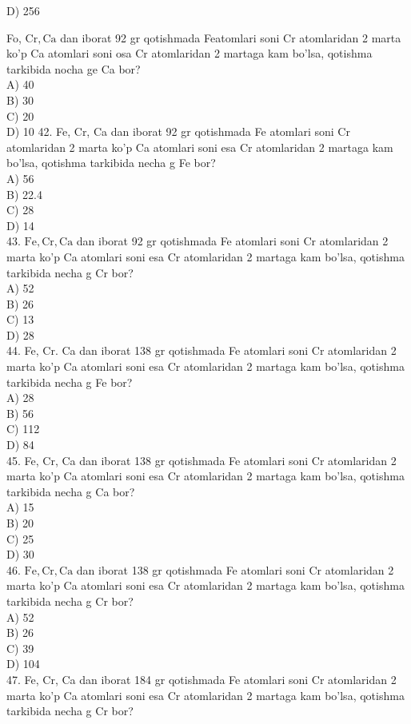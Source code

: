 D) 256
  \item Fo, $\mathrm{Cr}, \mathrm{Ca}$ dan iborat 92 gr qotishmada Featomlari soni Cr atomlaridan 2 marta ko'p Ca atomlari soni osa Cr atomlaridan 2 martaga kam bo'lsa, qotishma tarkibida nocha ge Ca bor?\\
A) 40\\
B) 30\\
C) 20\\
D) 10
42. Fe, Cr, Ca dan iborat 92 gr qotishmada Fe atomlari soni Cr atomlaridan 2 marta ko'p Ca atomlari soni esa Cr atomlaridan 2 martaga kam bo'lsa, qotishma tarkibida necha g Fe bor?\\
A) 56\\
B) 22.4\\
C) 28\\
D) 14\\
43. $\mathrm{Fe}, \mathrm{Cr}, \mathrm{Ca}$ dan iborat 92 gr qotishmada Fe atomlari soni Cr atomlaridan 2 marta ko'p Ca atomlari soni esa Cr atomlaridan 2 martaga kam bo'lsa, qotishma tarkibida necha g Cr bor?\\
A) 52\\
B) 26\\
C) 13\\
D) 28\\
44. Fe, Cr. Ca dan iborat 138 gr qotishmada Fe atomlari soni Cr atomlaridan 2 marta ko'p Ca atomlari soni esa Cr atomlaridan 2 martaga kam bo'lsa, qotishma tarkibida necha g Fe bor?\\
A) 28\\
B) 56\\
C) 112\\
D) 84\\
45. Fe, Cr, Ca dan iborat 138 gr qotishmada Fe atomlari soni Cr atomlaridan 2 marta ko'p Ca atomlari soni esa Cr atomlaridan 2 martaga kam bo'lsa, qotishma tarkibida necha g Ca bor?\\
A) 15\\
B) 20\\
C) 25\\
D) 30\\
46. $\mathrm{Fe}, \mathrm{Cr}, \mathrm{Ca}$ dan iborat 138 gr qotishmada Fe atomlari soni Cr atomlaridan 2 marta ko'p Ca atomlari soni esa Cr atomlaridan 2 martaga kam bo'lsa, qotishma tarkibida necha g Cr bor?\\
A) 52\\
B) 26\\
C) 39\\
D) 104\\
47. Fe, Cr, Ca dan iborat 184 gr qotishmada Fe atomlari soni Cr atomlaridan 2 marta ko'p Ca atomlari soni esa Cr atomlaridan 2 martaga kam bo'lsa, qotishma tarkibida necha g Cr bor?\\

